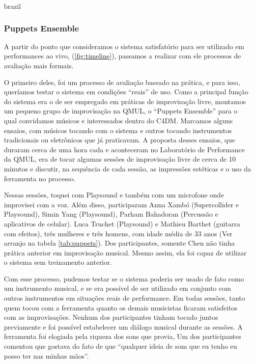 \begin{otherlanguage*}{brazil}



\subsubsection{Puppets Ensemble}

A partir do ponto que consideramos o sistema satisfatório para ser utilizado em performances ao vivo, (\ref{fig:timeline}), passamos a realizar com ele processos de avaliação mais formais. 

O primeiro deles, foi um processo de avaliação baseado na prática, e para isso, queríamos testar o sistema em condições ``reais'' de uso. Como a principal função do sistema era o de ser empregado em práticas de improvisação livre, montamos um pequeno grupo de improvisação na QMUL, o ``Puppets Ensemble'' para o qual convidamos músicos e interessados dentro do C4DM. Marcamos alguns ensaios, com músicos tocando com o sistema e outros tocando instrumentos tradicionais ou eletrônicos que já praticavam. A proposta desses ensaios, que duraram cerca de uma hora cada e aconteceram no Laboratório de Performance da QMUL, era de tocar algumas sessões de improvisação livre de cerca de 10 minutos e discutir, na sequência de cada sessão, as impressões estéticas e o uso da ferramenta no processo.

Nessas sessões, toquei com Playsound e também com um microfone onde improvisei com a voz. Além disso, participaram Anna Xambó (Supercollider e Playsound), Simin Yang (Playsound), Parham Bahadoran (Percussão e aplicativos de celular). Luca Truchet (Playsound) e Mathieu Barthet (guitarra com efeitos), três mulheres e três homens, com idade média de 33 anos (Ver arranjo na tabela \ref{tab:puppets}). Dos participantes, somente Chen não tinha prática anterior em improvisação musical. Mesmo assim, ela foi capaz de utilizar o sistema sem treinamento anterior.

Com esse processo, pudemos testar se o sistema poderia ser usado de fato como um instrumento musical, e se era possível de ser utilizado em conjunto com outros instrumentos em situações reais de performance. Em todas sessões, tanto quem tocou com a ferramenta quanto os demais musicistas ficaram satisfeitos com as improvisações. Nenhum dos participantes tinham tocado juntos previamente e foi possível estabelecer um diálogo musical durante as sessões. A ferramenta foi elogiada pela riqueza dos sons que provia, Um dos participantes comentou que gostava do fato de que ``qualquer ideia de som que eu tenho eu posso ter nas minhas mãos''. 


\end{otherlanguage*}
